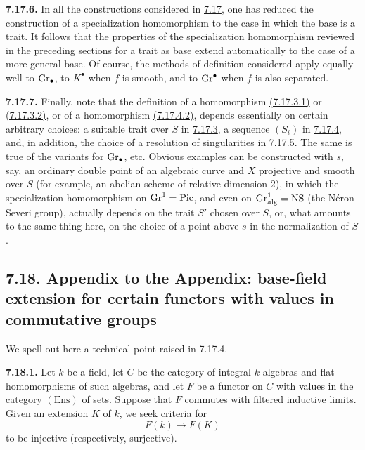 \textbf{7.17.6.}
In all the constructions considered in \hyperlink{sga6.e10.sec.7.17}{7.17}, one has reduced the
construction of a specialization homomorphism to the
case in which the base is a trait. It follows that the properties of the
specialization homomorphism reviewed in the preceding sections for a trait
as base extend automatically to the case of a more general base. Of course,
the methods of definition considered apply equally well to $\operatorname{Gr}_\bullet$,
to $K^\bullet$ when $f$ is smooth, and to $\operatorname{Gr}^\bullet$ when $f$ is also
separated.

\textbf{7.17.7.}
Finally, note that the definition of a homomorphism \hyperlink{sga6.e10.eq.7-17-3-1}{(7.17.3.1)} or
\hyperlink{sga6.e10.eq.7-17-3-2}{(7.17.3.2)}, or of a homomorphism \hyperlink{sga6.e10.eq.7-17-4-2}{(7.17.4.2)}, depends essentially on certain
arbitrary choices: a suitable trait over $S$ in \hyperlink{sga6.e10.para.7-17-3}{7.17.3}, a sequence $(S_i)$
in \hyperlink{sga6.e10.para.7-17-4}{7.17.4}, and, in addition, the choice of a resolution of singularities in
7.17.5. The same is true of the variants for $\operatorname{Gr}_\bullet$, etc. Obvious
examples can be constructed with $s$, say, an ordinary double point of an
algebraic curve and $X$ projective and smooth over $S$ (for example, an
abelian scheme of relative dimension $2$), in which the specialization
homomorphism on $\operatorname{Gr}^1=\operatorname{Pic}$, and even on
$\operatorname{Gr}^1_{\mathrm{alg}}=\mathrm{NS}$ (the Néron--Severi group), actually
depends on the trait $S'$ chosen over $S$, or, what amounts to the same thing
here, on the choice of a point above $s$ in the normalization of $S$.

\subsection*{7.18. Appendix to the Appendix: base-field extension for certain
functors with values in commutative groups}
We spell out here a technical point raised in 7.17.4.

\textbf{7.18.1.}
Let $k$ be a field, let $C$ be the category of integral $k$-algebras and
flat homomorphisms of such algebras, and let $F$ be a functor on $C$ with
values in the category $(\mathrm{Ens})$ of sets. Suppose that $F$ commutes
with filtered inductive limits. Given an extension $K$ of $k$, we seek
criteria
for
\[
F(k)\longrightarrow F(K)
\]
to be injective (respectively, surjective).

